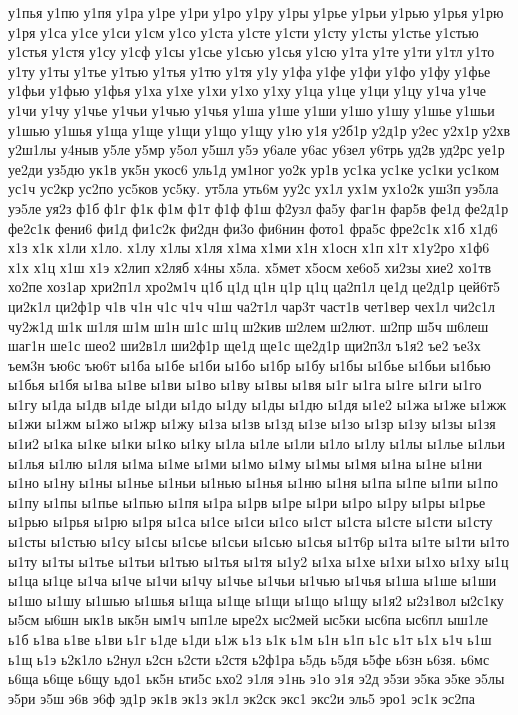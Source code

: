 {у1пья
у1пю
у1пя
у1ра
у1ре
у1ри
у1ро
у1ру
у1ры
у1рье
у1рьи
у1рью
у1рья
у1рю
у1ря
у1са
у1се
у1си
у1см
у1со
у1ста
у1сте
у1сти
у1сту
у1сты
у1стье
у1стью
у1стья
у1стя
у1су
у1сф
у1сы
у1сье
у1сью
у1сья
у1сю
у1та
у1те
у1ти
у1тл
у1то
у1ту
у1ты
у1тье
у1тью
у1тья
у1тю
у1тя
у1у
у1фа
у1фе
у1фи
у1фо
у1фу
у1фье
у1фьи
у1фью
у1фья
у1ха
у1хе
у1хи
у1хо
у1ху
у1ца
у1це
у1ци
у1цу
у1ча
у1че
у1чи
у1чу
у1чье
у1чьи
у1чью
у1чья
у1ша
у1ше
у1ши
у1шо
у1шу
у1шье
у1шьи
у1шью
у1шья
у1ща
у1ще
у1щи
у1що
у1щу
у1ю
у1я
у2б1р
у2д1р
у2ес
у2х1р
у2хв
у2ш1лы
у4ныв
у5ле
у5мр
у5ол
у5шл
у5э
у6але
у6ас
у6зел
у6трь
уд2в
уд2рс
уе1р
уе2ди
уз5дю
ук1в
ук5н
укос6
уль1д
ум1ног
уо2к
ур1в
ус1ка
ус1ке
ус1ки
ус1ком
ус1ч
ус2кр
ус2по
ус5ков
ус5ку.
ут5ла
уть6м
уу2с
ух1л
ух1м
ух1о2к
уш3п
уэ5ла
уэ5ле
уя2з
ф1б
ф1г
ф1к
ф1м
ф1т
ф1ф
ф1ш
ф2узл
фа5у
фаг1н
фар5в
фе1д
фе2д1р
фе2с1к
фени6
фи1д
фи1с2к
фи2дн
фи3о
фи6нин
фото1
фра5с
фре2с1к
х1б
х1д6
х1з
х1к
х1ли
х1ло.
х1лу
х1лы
х1ля
х1ма
х1ми
х1н
х1осн
х1п
х1т
х1у2ро
х1ф6
х1х
х1ц
х1ш
х1э
х2лип
х2ляб
х4ны
х5ла.
х5мет
х5осм
хе6о5
хи2зы
хие2
хо1тв
хо2пе
хоз1ар
хри2п1л
хро2м1ч
ц1б
ц1д
ц1н
ц1р
ц1ц
ца2п1л
це1д
це2д1р
цей6т5
ци2к1л
ци2ф1р
ч1в
ч1н
ч1с
ч1ч
ч1ш
ча2т1л
чар3т
част1в
чет1вер
чех1л
чи2с1л
чу2ж1д
ш1к
ш1ля
ш1м
ш1н
ш1с
ш1ц
ш2кив
ш2лем
ш2лют.
ш2пр
ш5ч
ш6леш
шаг1н
ше1с
шео2
ши2в1л
ши2ф1р
ще1д
ще1с
ще2д1р
щи2п3л
ъ1я2
ъе2
ъе3х
ъем3н
ъю6с
ъю6т
ы1ба
ы1бе
ы1би
ы1бо
ы1бр
ы1бу
ы1бы
ы1бье
ы1бьи
ы1бью
ы1бья
ы1бя
ы1ва
ы1ве
ы1ви
ы1во
ы1ву
ы1вы
ы1вя
ы1г
ы1га
ы1ге
ы1ги
ы1го
ы1гу
ы1да
ы1дв
ы1де
ы1ди
ы1до
ы1ду
ы1ды
ы1дю
ы1дя
ы1е2
ы1жа
ы1же
ы1жж
ы1жи
ы1жм
ы1жо
ы1жр
ы1жу
ы1за
ы1зв
ы1зд
ы1зе
ы1зо
ы1зр
ы1зу
ы1зы
ы1зя
ы1и2
ы1ка
ы1ке
ы1ки
ы1ко
ы1ку
ы1ла
ы1ле
ы1ли
ы1ло
ы1лу
ы1лы
ы1лье
ы1льи
ы1лья
ы1лю
ы1ля
ы1ма
ы1ме
ы1ми
ы1мо
ы1му
ы1мы
ы1мя
ы1на
ы1не
ы1ни
ы1но
ы1ну
ы1ны
ы1нье
ы1ньи
ы1нью
ы1нья
ы1ню
ы1ня
ы1па
ы1пе
ы1пи
ы1по
ы1пу
ы1пы
ы1пье
ы1пью
ы1пя
ы1ра
ы1рв
ы1ре
ы1ри
ы1ро
ы1ру
ы1ры
ы1рье
ы1рью
ы1рья
ы1рю
ы1ря
ы1са
ы1се
ы1си
ы1со
ы1ст
ы1ста
ы1сте
ы1сти
ы1сту
ы1сты
ы1стью
ы1су
ы1сы
ы1сье
ы1сьи
ы1сью
ы1сья
ы1т6р
ы1та
ы1те
ы1ти
ы1то
ы1ту
ы1ты
ы1тье
ы1тьи
ы1тью
ы1тья
ы1тя
ы1у2
ы1ха
ы1хе
ы1хи
ы1хо
ы1ху
ы1ц
ы1ца
ы1це
ы1ча
ы1че
ы1чи
ы1чу
ы1чье
ы1чьи
ы1чью
ы1чья
ы1ша
ы1ше
ы1ши
ы1шо
ы1шу
ы1шью
ы1шья
ы1ща
ы1ще
ы1щи
ы1що
ы1щу
ы1я2
ы2з1вол
ы2с1ку
ы5см
ы6шн
ык1в
ык5н
ым1ч
ып1ле
ыре2х
ыс2мей
ыс5ки
ыс6па
ыс6пл
ыш1ле
ь1б
ь1ва
ь1ве
ь1ви
ь1г
ь1де
ь1ди
ь1ж
ь1з
ь1к
ь1м
ь1н
ь1п
ь1с
ь1т
ь1х
ь1ч
ь1ш
ь1щ
ь1э
ь2к1ло
ь2нул
ь2сн
ь2сти
ь2стя
ь2ф1ра
ь5дь
ь5дя
ь5фе
ь6зн
ь6зя.
ь6мс
ь6ща
ь6ще
ь6щу
ьдо1
ьк5н
ьти5с
ьхо2
э1ля
э1нь
э1о
э1я
э2д
э5зи
э5ка
э5ке
э5лы
э5ри
э5ш
э6в
э6ф
эд1р
эк1в
эк1з
эк1л
эк2ск
экс1
экс2и
эль5
эро1
эс1к
эс2па
}
